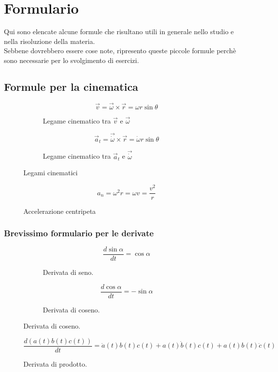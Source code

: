 \documentclass[main.tex]{subfiles}
\begin{document}
\chapter{Formulario}
Qui sono elencate alcune formule che risultano utili in generale nello studio e nella risoluzione della materia.
\\
Sebbene dovrebbero essere cose note, ripresento queste piccole formule perchè sono necessarie per lo svolgimento di esercizi.
\section{Formule per la cinematica}
\begin{figure}[H]
  \begin{subfigure}[b]{.5\textwidth}
  \centering
\[
	\vec{v} = \vec{\omega}\times\vec{r} = \omega r \sin\theta
\]
  \caption{Legame cinematico tra $\vec{v}$ e $\vec{\omega}$}
  \end{subfigure}
  \hfill
  \begin{subfigure}[b]{.5\textwidth}
  \centering
\[
	\vec{a}_t = \vec{\dot{\omega}}\times\vec{r} = \dot{\omega} r \sin\theta
\]
  \caption{Legame cinematico tra $\vec{a}_t$ e $\vec{\dot{\omega}}$}
  \end{subfigure}
  \caption{Legami cinematici}
\end{figure}

\begin{figure}[H]
  \centering
\[
	a_n = \omega^2 r = \omega v = \dfrac{v^2}{r}
\]
  \caption{Accelerazione centripeta}
\end{figure}
\subsection{Brevissimo formulario per le derivate}
\begin{figure}[H]
  \begin{subfigure}[b]{.5\textwidth}
  \centering
\[
	\dfrac{d\sin\alpha}{dt} = \cos\alpha
\]
  \caption{Derivata di seno.}
  \end{subfigure}
  \hfill
  \begin{subfigure}[b]{.5\textwidth}
  \centering
\[
	\dfrac{d\cos\alpha}{dt} = -\sin\alpha
\]
  \caption{Derivata di coseno.}
  \end{subfigure}
\end{figure}

\begin{figure}[H]
  \centering
\[
	\dfrac{d(a(t)b(t)c(t))}{dt} = \dot{a}(t)b(t)c(t) + a(t)\dot{b}(t)c(t) + a(t)b(t)\dot{c}(t)
\]
  \caption{Derivata di prodotto.}
\end{figure}
\end{document}
